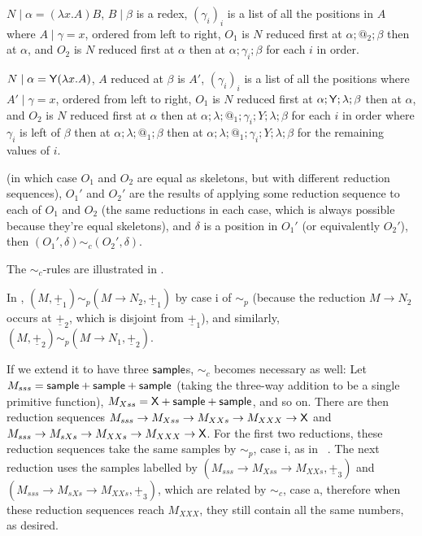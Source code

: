 \begin{definition}
\begin{asparaenum}[(i)]
\begin{compactenum}
        \item $N \mid \alpha = (\lambda x. A) B$, $B \mid \beta$ is a redex, $(\gamma_i)_i$ is a list of all the positions in $A$ where $A \mid \gamma = x$, ordered from left to right, $O_1$ is $N$ reduced first at $\alpha ; @_2 ; \beta$ then at $\alpha$, and $O_2$ is $N$ reduced first at $\alpha$ then at $\alpha;\gamma_i;\beta$ for each $i$ in order.
        
        \item $N \mid \alpha = \mathsf{Y} (\lambda x. A)$, $A$ reduced at $\beta$ is $A'$, $(\gamma_i)_i$ is a list of all the positions where $A' \mid \gamma  = x$, ordered from left to right, $O_1$ is $N$ reduced first at $\alpha;\mathsf{Y};\lambda;\beta$ then at $\alpha$, and $O_2$ is $N$ reduced first at $\alpha$ then at $\alpha;\lambda;@_1;\gamma_i;Y;\lambda;\beta$ for each $i$ in order where $\gamma_i$ is left of $\beta$ then at $\alpha;\lambda;@_1;\beta$ then at $\alpha;\lambda;@_1;\gamma_i;Y;\lambda;\beta$ for the remaining values of $i$.
    \end{compactenum}
    (in which case $O_1$ and $O_2$ are equal as skeletons, but with different reduction sequences), $O_1'$ and $O_2'$ are the results of applying some reduction sequence to each of $O_1$ and $O_2$ (the same reductions in each case, which is always possible because they're equal skeletons), and $\delta$ is a position in $O_1'$ (or equivalently $O_2'$), then $(O_1',\delta) \sim_c (O_2',\delta)$.
\end{asparaenum}
The $\sim_c$-rules are illustrated in .
\end{definition}

\begin{example}
In , $(M,\underline{+}_1) \sim_p (M \to N_2,\underline{+}_1)$ by case i of $\sim_p$ (because the reduction $M \to N_2$ occurs at $\underline{+}_2$, which is disjoint from $\underline{+}_1$), and similarly, $(M,\underline{+}_2) \sim_p (M \to N_1,\underline{+}_2)$.

If we extend it to have three $\mathsf{sample}$s, $\sim_c$ becomes necessary as well: Let $M_{sss} = \mathsf{sample} + \mathsf{sample} + \mathsf{sample}$ (taking the three-way addition to be a single primitive function), $M_{Xss} = \mathsf{X} + \mathsf{sample} + \mathsf{sample}$, and so on. There are then reduction sequences $M_{sss} \to M_{Xss} \to M_{XXs} \to M_{XXX} \to \mathsf{X}$ and $M_{sss} \to M_{sXs} \to M_{XXs} \to M_{XXX} \to \mathsf{X}$. For the first two reductions, these reduction sequences take the same samples by $\sim_p$, case i, as in ~. The next reduction uses the samples labelled by $(M_{sss} \to M_{Xss} \to M_{XXs}, \underline{+}_3)$ and $(M_{sss} \to M_{sXs} \to M_{XXs}, \underline{+}_3)$, which are related by $\sim_c$, case a, therefore when these reduction sequences reach $M_{XXX}$, they still contain all the same numbers, as desired.
\end{example}

